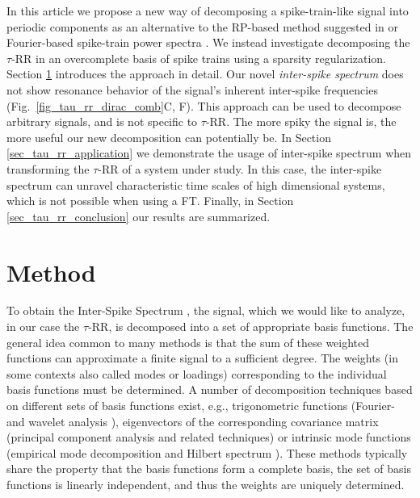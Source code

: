 \documentclass[entropy,article,submit,pdftex,moreauthors]{Definitions/mdpi}
\begin{document}
In this article we propose a new way of decomposing a spike-train-like signal into periodic components as 
an alternative to the RP-based method suggested in \cite{Zbilut2008} or Fourier-based spike-train power 
spectra \cite{Dummer2014}. We instead investigate decomposing the $\tau$-RR in an overcomplete basis of spike trains using a sparsity regularization. Section \ref{sec_tau_rr_method} introduces the approach in detail. Our novel \textit{inter-spike spectrum} does not show resonance 
behavior of the signal's inherent inter-spike frequencies (Fig.~\ref{fig_tau_rr_dirac_comb}C, F). This approach can be used to decompose arbitrary signals, and is not specific to $\tau$-RR. The more spiky the signal is, the more useful our new decomposition can potentially be. In Section \ref{sec_tau_rr_application} we demonstrate the usage of inter-spike spectrum when transforming the $\tau$-RR of a system under study. In this case, the inter-spike spectrum 
can unravel characteristic time scales of high dimensional systems, which is not possible when using a FT. Finally, in Section \ref{sec_tau_rr_conclusion} our results are summarized.


\section{Method}\label{sec_tau_rr_method}
    
To obtain the Inter-Spike Spectrum , the signal, which we would like to analyze, in our case the $\tau$-RR, is decomposed into a set of appropriate basis functions. 
The general idea common to many methods is that the sum of these weighted functions can approximate a finite signal to a sufficient degree. The weights (in some contexts also called modes or loadings) corresponding to the individual basis functions must be determined.
A number of decomposition techniques based on different sets of basis functions exist, e.g., 
trigonometric functions (Fourier- and wavelet analysis \cite{Bracewell1986}), 
eigenvectors of the corresponding covariance matrix (principal component analysis \cite{Hotelling1933} and related techniques) 
or intrinsic mode functions (empirical mode decomposition and Hilbert spectrum \cite{Norden1998}).
These methods typically share the property that the basis functions form a complete basis,
the set of basis functions is linearly independent, and thus the weights are uniquely determined.
\end{document}
